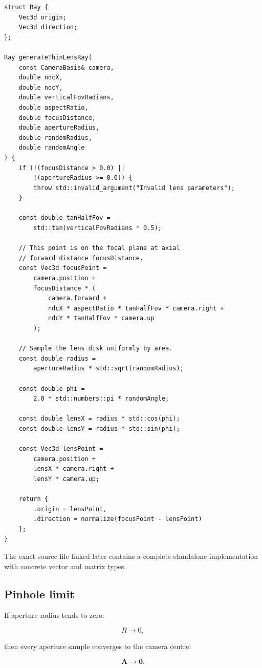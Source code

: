 \begin{verbatim}
struct Ray {
    Vec3d origin;
    Vec3d direction;
};

Ray generateThinLensRay(
    const CameraBasis& camera,
    double ndcX,
    double ndcY,
    double verticalFovRadians,
    double aspectRatio,
    double focusDistance,
    double apertureRadius,
    double randomRadius,
    double randomAngle
) {
    if (!(focusDistance > 0.0) ||
        !(apertureRadius >= 0.0)) {
        throw std::invalid_argument("Invalid lens parameters");
    }

    const double tanHalfFov =
        std::tan(verticalFovRadians * 0.5);

    // This point is on the focal plane at axial
    // forward distance focusDistance.
    const Vec3d focusPoint =
        camera.position +
        focusDistance * (
            camera.forward +
            ndcX * aspectRatio * tanHalfFov * camera.right +
            ndcY * tanHalfFov * camera.up
        );

    // Sample the lens disk uniformly by area.
    const double radius =
        apertureRadius * std::sqrt(randomRadius);

    const double phi =
        2.0 * std::numbers::pi * randomAngle;

    const double lensX = radius * std::cos(phi);
    const double lensY = radius * std::sin(phi);

    const Vec3d lensPoint =
        camera.position +
        lensX * camera.right +
        lensY * camera.up;

    return {
        .origin = lensPoint,
        .direction = normalize(focusPoint - lensPoint)
    };
}
\end{verbatim}

The exact source file linked later contains a complete standalone implementation with concrete vector and matrix types.

\subsection{Pinhole limit}\label{02-foundations-ii-ch036-pinhole-limit}

\hypertarget{02-foundations-ii-ch036-pinhole-limit}{}

If aperture radius tends to zero:

\[ R\to0, \]

then every aperture sample converges to the camera centre:

\[ \mathbf A\to\mathbf0. \]

